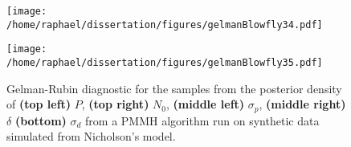 \documentclass[12pt]{article}
\begin{document}
\begin{appendices}
\begin{figure}[htb]
\begin{minipage}{0.49\textwidth}
			\centering
			\texttt{[image: /home/raphael/dissertation/figures/gelmanBlowfly34.pdf]}
		\end{minipage}
		\begin{minipage}{0.49\textwidth}
			\centering
			\texttt{[image: /home/raphael/dissertation/figures/gelmanBlowfly35.pdf]}
		\end{minipage}
		\caption[Gelman-Rubin diagnostic of the chains of a PMMH algorithm run on on synthetic data, Nicholson's model]{Gelman-Rubin diagnostic for the samples from the posterior density of \textbf{(top left)} $P$, \textbf{(top right)} $N_0$,  \textbf{(middle left)} $\sigma_p$,  \textbf{(middle right)} $\delta$ \textbf{(bottom)} $\sigma_d$ from a PMMH algorithm run on synthetic data simulated from Nicholson's model.}
		\label{fig:gelmanBlowfly}
	\end{figure}
\end{appendices}
	
\end{document}
